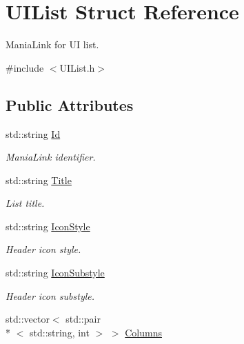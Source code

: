 \hypertarget{structUIList}{\section{U\-I\-List Struct Reference}
\label{structUIList}
}


Mania\-Link for U\-I list.  




{\ttfamily \#include $<$U\-I\-List.\-h$>$}

\subsection*{Public Attributes}
\begin{DoxyCompactItemize}
\item 
\hypertarget{structUIList_ae551552dcaae820fe1cc6413c61c8ecc}{std\-::string \hyperlink{structUIList_ae551552dcaae820fe1cc6413c61c8ecc}{Id}}\label{structUIList_ae551552dcaae820fe1cc6413c61c8ecc}

\begin{DoxyCompactList}\small\item\em Mania\-Link identifier. \end{DoxyCompactList}\item 
\hypertarget{structUIList_a653f1be5fe8e835df46a7068c49ff75e}{std\-::string \hyperlink{structUIList_a653f1be5fe8e835df46a7068c49ff75e}{Title}}\label{structUIList_a653f1be5fe8e835df46a7068c49ff75e}

\begin{DoxyCompactList}\small\item\em List title. \end{DoxyCompactList}\item 
\hypertarget{structUIList_a43200f878fb7b0d3575e3ae9181f8dab}{std\-::string \hyperlink{structUIList_a43200f878fb7b0d3575e3ae9181f8dab}{Icon\-Style}}\label{structUIList_a43200f878fb7b0d3575e3ae9181f8dab}

\begin{DoxyCompactList}\small\item\em Header icon style. \end{DoxyCompactList}\item 
\hypertarget{structUIList_aa12ecc6bec2a12f1aa3bf9ffba33aa3c}{std\-::string \hyperlink{structUIList_aa12ecc6bec2a12f1aa3bf9ffba33aa3c}{Icon\-Substyle}}\label{structUIList_aa12ecc6bec2a12f1aa3bf9ffba33aa3c}

\begin{DoxyCompactList}\small\item\em Header icon substyle. \end{DoxyCompactList}\item 
\hypertarget{structUIList_a20ea14a5e0714135b877a3684cca4da9}{std\-::vector$<$ std\-::pair\\*
$<$ std\-::string, int $>$ $>$ \hyperlink{structUIList_a20ea14a5e0714135b877a3684cca4da9}{Columns}}\label{structUIList_a20ea14a5e0714135b877a3684cca4da9}


\end{DoxyCompactItemize}
